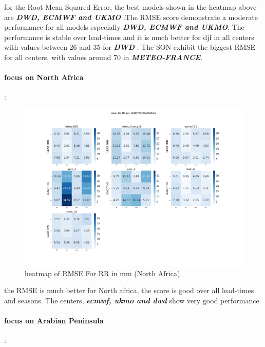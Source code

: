 for the Root Mean Squared Error, the best models shown in the heatmap above are \textbf{\textit{DWD, ECMWF and UKMO}} .The RMSE score demonstrate a moderate performance for all models especially \textbf{\textit{DWD, ECMWF and UKMO}}. The performance is stable over lead-times and it is much better for djf in all centers with values between 26 and 35 for \textbf{\textit{DWD}} . The SON exhibit the biggest RMSE for all centers, with values around 70 in \textbf{\textit{METEO-FRANCE}}.

\paragraph{focus on North Africa} : 
\begin{figure}[H]
\centering
\includegraphics[scale=0.3]{plots/det/rmse/rmse_RR_NorthAfrica.png}
\caption{heatmap of RMSE For RR in mm (North Africa)}
\end{figure}

the RMSE is much better for North africa, the score is good over all lead-times and seasons. The centers, \textbf{\textit{ecmwf, ukmo and dwd}} show very good performance.

\vspace{1.5cm}
\paragraph{focus on Arabian Peninsula}:


